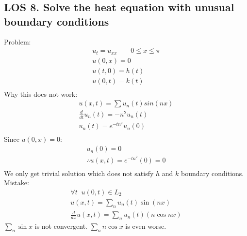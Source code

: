 \documentclass[12pt, a4paper]{article}
\begin{document}
\subsection*{LOS 8. Solve the heat equation with unusual boundary conditions}
Problem:
\begin{gather*}
    u_t = u_{xx} \qquad 0 \leq x \leq \pi\\
    u(0, x) = 0\\
    u(t, 0)=h(t)\\
    u(0, t)=k(t)\\
\end{gather*}
Why this does not work:
\begin{gather*}
    u(x, t) = \sum u_n(t)sin(nx)\\
    \frac{d}{dt} u_n(t) = -n^2u_n(t)\\
    u_n(t) = e^{-tn^2}u_n(0)\\
\end{gather*}
Since $u(0, x) = 0$:
\begin{gather*}
    u_n(0)=0\\
    \therefore u(x,t) = e^{-tn^2}(0) = 0\\
\end{gather*} 
We only get trivial solution which does not satisfy $h$ and $k$ boundary conditions.\\
Mistake:
\begin{gather*}
    \forall t\;\; u(0,t) \in L_2\\
    u(x, t) = \sum_n u_n(t)\sin(nx)\\
    \frac{d}{dx}u(x, t)=\sum_n u_n(t)(n \cos nx)
\end{gather*}
$\sum_n \sin{x}$ is not convergent. $\sum_n n\cos{x}$ is even worse.
\vspace{0.3em}
\end{document}

